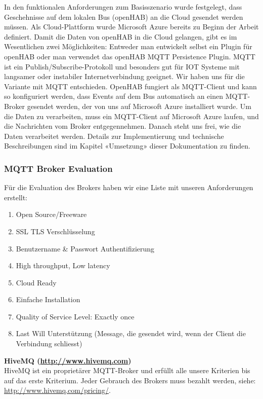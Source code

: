 In den funktionalen Anforderungen zum Basisszenario wurde festgelegt, dass Geschehnisse auf dem lokalen Bus (openHAB) an die Cloud gesendet werden müssen. Als Cloud-Plattform wurde Microsoft Azure bereits zu Beginn der Arbeit definiert. Damit die Daten von openHAB in die Cloud gelangen, gibt es im Wesentlichen zwei Möglichkeiten: Entweder man entwickelt selbst ein Plugin für openHAB oder man verwendet das openHAB MQTT Persistence Plugin. MQTT ist ein Publish/Subscribe-Protokoll und besonders gut für IOT Systeme mit langsamer oder instabiler Internetverbindung geeignet. Wir haben uns für die Variante mit MQTT entschieden. OpenHAB fungiert als MQTT-Client und kann so konfiguriert werden, dass Events auf dem Bus automatisch an einen MQTT-Broker gesendet werden, der von uns auf Microsoft Azure installiert wurde. Um die Daten zu verarbeiten, muss ein MQTT-Client auf Microsoft Azure laufen, und die Nachrichten vom Broker entgegennehmen. Danach steht uns frei, wie die Daten verarbeitet werden. Details zur Implementierung und technische Beschreibungen sind im Kapitel «Umsetzung» dieser Dokumentation zu finden. 

\subsubsection{MQTT Broker Evaluation}
Für die Evaluation des Brokers haben wir eine Liste mit unseren Anforderungen erstellt: 

\begin{enumerate}
	\item Open Source/Freeware
	\item SSL TLS Verschlüsselung
	\item Benutzername \& Passwort Authentifizierung
	\item High throughput, Low latency
	\item Cloud Ready
	\item Einfache Installation
	\item Quality of Service Level: Exactly once
	\item Last Will Unterstützung (Message, die gesendet wird, wenn der Client die Verbindung schliesst)
\end{enumerate}

\textbf{HiveMQ (\url{http://www.hivemq.com})} \\
HiveMQ ist ein proprietärer MQTT-Broker und erfüllt alle unsere Kriterien bis auf das erste Kriterium. Jeder Gebrauch des Brokers muss bezahlt werden, siehe: \url{http://www.hivemq.com/pricing/}.


